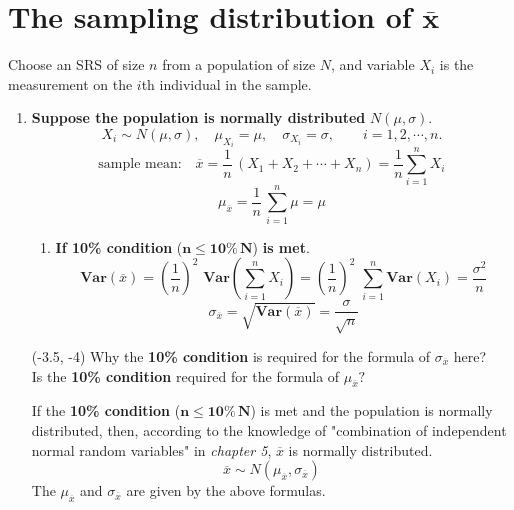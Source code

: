 \documentclass[a4paper, 12pt,twoside]{book}
\begin{document}
 \section{The sampling distribution of $\mathbf{\bar{x}}$}
  Choose an SRS of size $n$ from a population of size $N$, and variable $X_i$ is the measurement on the $i$th individual in the sample.
    \begin{enumerate}[(1)]
        \item \textbf{Suppose the population is normally distributed} $N(\mu, \sigma)$.
        $$X_i \sim N(\mu, \sigma), \quad \mu_{X_i} = \mu, \quad \sigma_{X_i} = \sigma, \qquad i = 1, 2, \cdots, n.$$
        $$\text{sample mean:}\quad\overline{x} = \frac{1}{n}\, (X_1 + X_2 + \cdots + X_n) = \frac{1}{n}\sum_{i=1}^n X_i$$
        $$\mu_{\overline{x}} = \frac{1}{n}\, \sum_{i=1}^n \mu  = \mu$$
        \vspace{0.3cm}
        \begin{enumerate}[$\bullet$]        
        \item \textbf{ If 10\% condition} ($\mathbf{n \leq 10\%\,N}$) \textbf{is met}.
                $$\textbf{Var}(\overline{x}) = (\frac{1}{n})^2 \,\,\textbf{Var}(\sum_{i=1}^n X_i) = (\frac{1}{n})^2 \,\, \sum_{i=1}^n \textbf{Var}(X_i) = \frac{\sigma^2}{n}$$
        $$\sigma_{\overline{x}} = \sqrt{\textbf{Var}(\overline{x})} = \frac{\sigma}{\sqrt{n}}$$ 
         \end{enumerate}
         
         \begin{textblock}{4}(-3.5, -4)
         Why the \textbf{10\% condition} is required for the formula  of $\sigma_{\overline{x}}$ here?\vspace{0.2cm}\\         
         Is the \textbf{10\% condition} required for the formula of $\mu_{\overline{x}}?$
         \end{textblock}
         \vspace{0.8cm}
         
         If the \textbf{10\% condition} ($\mathbf{n \leq 10\%\,N}$) is met and the population is normally distributed, then, according to the knowledge of "combination of independent normal random variables" in \textit{chapter 5}, $\overline{x}$ is normally distributed.
         $$\overline{x} \sim N(\mu_{\overline{x}}, \sigma_{\overline{x}})$$
The $\mu_{\overline{x}}$ and $\sigma_{\overline{x}}$ are given by the above formulas.\vspace{0.6cm}


\end{enumerate}
\end{document}
